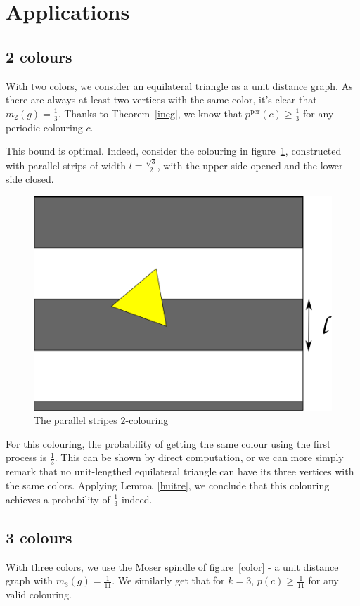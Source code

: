 \documentclass[a4paper,11pt]{article}
\theoremstyle{definition}
\theoremstyle{remark}
\newcommand{\pper}{p^{\mathrm{per}}}
\begin{document}
\section{Applications} \label{appli}
\subsection{2 colours}

With two colors, we consider an equilateral triangle as a unit distance graph. 
As there are always at least two vertices with the same color, it's clear that 
$m_2(g) = \frac{1}{3}$. Thanks to Theorem~\ref{ineg}, 
we know that $\pper(c) \geq \frac13$ for any periodic colouring $c$.

This bound is optimal. Indeed, consider the colouring in figure~\ref{couleur}, 
constructed with parallel strips of width 
$l = \frac {\sqrt3}{2}$, with the upper side opened and the lower side closed. 

\begin{figure}[h]
\center
\includegraphics[scale=0.5]{path6509.png}
\caption{\label{couleur} The parallel stripes $2$-colouring}
\end{figure}

For this colouring, the probability of getting the same colour using the first 
process is $\frac13$. This can be shown by direct computation, or we can 
more simply remark that no unit-lengthed equilateral triangle can have its 
three vertices with the same colors. Applying Lemma~\ref{huitre}, we conclude 
that this colouring achieves a probability of $\frac{1}{3}$ indeed.

\subsection{3 colours}
 With three colors, we use the Moser spindle of figure~\ref{color} - a unit 
 distance graph with $m_3(g) = \frac{1}{11}$.
 We similarly get that for $k=3$, $p(c) \geq \frac{1}{11}$ for any valid colouring. 
\end{document}

